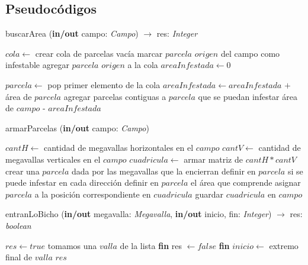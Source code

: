 \clearpage


\subsection{Pseudocódigos}

\begin{algorithm}
\caption{buscarArea (\textbf{in/out} campo: \textsl{Campo}) $\rightarrow$ res: \textsl{Integer}}
\begin{algorithmic}[1]

\STATE $cola \leftarrow$ crear cola de parcelas vacía
\STATE marcar $parcela$ $origen$ del campo como infestable
\STATE agregar $parcela$ $origen$ a la cola
\STATE $areaInfestada \leftarrow 0$

	\STATE $parcela \leftarrow$ pop primer elemento de la cola
	\STATE $areaInfestada \leftarrow areaInfestada$ $+$ área de $parcela$ 
	\STATE agregar parcelas contiguas a $parcela$ que se puedan infestar
\ENDWHILE
\RETURN área de $campo$ - $areaInfestada$
\end{algorithmic}
\end{algorithm}

\begin{algorithm}
\caption{armarParcelas (\textbf{in/out} campo: \textsl{Campo})}
\begin{algorithmic}[1]

\STATE $cantH \leftarrow$ cantidad de megavallas horizontales en el $campo$
\STATE $cantV \leftarrow$ cantidad de megavallas verticales en el $campo$
\STATE $cuadricula \leftarrow$ armar matriz de $cantH*cantV$
		\STATE crear una $parcela$ dada por las megavallas que la encierran
		\STATE definir en $parcela$ si se puede infestar en cada dirección
		\STATE definir en $parcela$ el área que comprende
		\STATE asignar $parcela$ a la posición correspondiente en $cuadricula$
	\ENDWHILE
\ENDWHILE
\STATE guardar $cuadricula$ en $campo$
\end{algorithmic}
\end{algorithm}

\begin{algorithm}
\caption{entranLoBicho (\textbf{in/out} megavalla: \textsl{Megavalla}, \textbf{in/out} inicio, fin: \textsl{Integer}) $\rightarrow$ res: \textsl{boolean}}
\begin{algorithmic}[1]

\STATE $res \leftarrow true$
	\STATE tomamos una $valla$ de la lista
		\STATE \textbf{fin}
	\ELSE
			\STATE res $\leftarrow false$
			\STATE \textbf{fin}
		\ELSE
			\STATE $inicio \leftarrow$ extremo final de $valla$
		\ENDIF
	\ENDIF
\ENDWHILE
\RETURN $res$
\end{algorithmic}
\end{algorithm}

